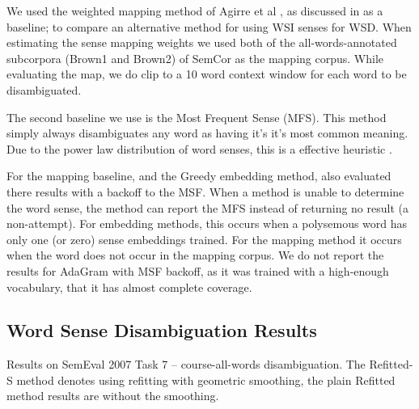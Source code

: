 \documentclass{sig-alternate}
\begin{document}
We used the weighted mapping method of Agirre et al \parencite{agirre2006}, as discussed in  as a baseline; to compare an alternative method for using WSI senses for WSD.
When estimating the sense mapping weights we used both of the all-words-annotated subcorpora (Brown1 and Brown2) of SemCor as the mapping corpus.
While evaluating the map, we do clip to a 10 word context window for each word to be disambiguated.

The second baseline we use is the Most Frequent Sense (MFS). This method simply always disambiguates any word as having it's it's most common meaning. Due to the power law distribution of word senses, this is a effective heuristic \parencite{Kilgarriff2004}.

For the mapping baseline, and the Greedy embedding method, also evaluated there results with a backoff to the MSF. When a method is unable to determine the word sense, the method can report the MFS instead of returning no result (a non-attempt). For embedding methods, this occurs when a polysemous word has only one (or zero) sense embeddings trained. For the mapping method it occurs when the word does not occur in the mapping corpus. We do not report the results for AdaGram with MSF backoff, as it was trained with a high-enough vocabulary, that it has almost complete coverage.

\subsection{Word Sense Disambiguation Results} \label{WSDtask}
\begin{table}
	\begin{adjustbox}{max width=\columnwidth}
	\end{adjustbox}

	\caption{Results on SemEval 2007 Task 7 -- course-all-words disambiguation. The Refitted-S method denotes using refitting with geometric smoothing, the plain Refitted method results are without the smoothing. 
	} \label{samevalres}
\end{table}
\end{document}
